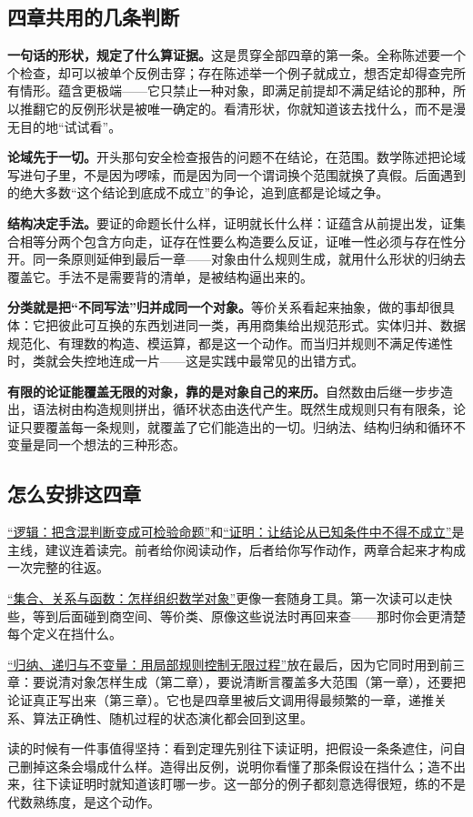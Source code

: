\subsection{四章共用的几条判断}

\textbf{一句话的形状，规定了什么算证据。}这是贯穿全部四章的第一条。全称陈述要一个个检查，却可以被单个反例击穿；存在陈述举一个例子就成立，想否定却得查完所有情形。蕴含更极端——它只禁止一种对象，即满足前提却不满足结论的那种，所以推翻它的反例形状是被唯一确定的。看清形状，你就知道该去找什么，而不是漫无目的地“试试看”。

\textbf{论域先于一切。}开头那句安全检查报告的问题不在结论，在范围。数学陈述把论域写进句子里，不是因为啰嗦，而是因为同一个谓词换个范围就换了真假。后面遇到的绝大多数“这个结论到底成不成立”的争论，追到底都是论域之争。

\textbf{结构决定手法。}要证的命题长什么样，证明就长什么样：证蕴含从前提出发，证集合相等分两个包含方向走，证存在性要么构造要么反证，证唯一性必须与存在性分开。同一条原则延伸到最后一章——对象由什么规则生成，就用什么形状的归纳去覆盖它。手法不是需要背的清单，是被结构逼出来的。

\textbf{分类就是把“不同写法”归并成同一个对象。}等价关系看起来抽象，做的事却很具体：它把彼此可互换的东西划进同一类，再用商集给出规范形式。实体归并、数据规范化、有理数的构造、模运算，都是这一个动作。而当归并规则不满足传递性时，类就会失控地连成一片——这是实践中最常见的出错方式。

\textbf{有限的论证能覆盖无限的对象，靠的是对象自己的来历。}自然数由后继一步步造出，语法树由构造规则拼出，循环状态由迭代产生。既然生成规则只有有限条，论证只要覆盖每一条规则，就覆盖了它们能造出的一切。归纳法、结构归纳和循环不变量是同一个想法的三种形态。

\subsection{怎么安排这四章}

\hyperref[ch:005]{“逻辑：把含混判断变成可检验命题”}和\hyperref[ch:007]{“证明：让结论从已知条件中不得不成立”}是主线，建议连着读完。前者给你阅读动作，后者给你写作动作，两章合起来才构成一次完整的往返。

\hyperref[ch:006]{“集合、关系与函数：怎样组织数学对象”}更像一套随身工具。第一次读可以走快些，等到后面碰到商空间、等价类、原像这些说法时再回来查——那时你会更清楚每个定义在挡什么。

\hyperref[ch:008]{“归纳、递归与不变量：用局部规则控制无限过程”}放在最后，因为它同时用到前三章：要说清对象怎样生成（第二章），要说清断言覆盖多大范围（第一章），还要把论证真正写出来（第三章）。它也是四章里被后文调用得最频繁的一章，递推关系、算法正确性、随机过程的状态演化都会回到这里。

读的时候有一件事值得坚持：看到定理先别往下读证明，把假设一条条遮住，问自己删掉这条会塌成什么样。造得出反例，说明你看懂了那条假设在挡什么；造不出来，往下读证明时就知道该盯哪一步。这一部分的例子都刻意选得很短，练的不是代数熟练度，是这个动作。